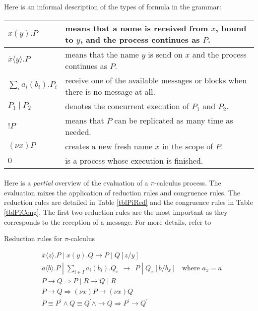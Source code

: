 \documentclass[a4paper]{report}
\numberwithin{algorithm}{chapter}
\begin{document}
\noindent
Here is an informal description of the types of formula in the grammar:\\
{\centering
\begin{tabular}{lp{9cm}}
\hline
\hline
$x(y).P$ & means that a name is received from $x$, bound to $y$, and the process continues as $P$. \\
\hline
$\overline{x} \langle y \rangle.P$ & means that the name $y$ is send on $x$ and the process continues as $P$. \\
\hline
$\sum_i a_i(b_i).P_i $ & receive one of the available messages or blocks when there is no message at all.\\
\hline
$P_1\;|\;P_2$ & denotes the concurrent execution of $P_1$ and $P_2$. \\
\hline
$!P$ & means that $P$ can be replicated as many time as needed.\\
\hline
$(\nu x)P$ & creates a new fresh name $x$ in the scope of $P$.\\%
\hline
$0$ & is a process whose execution is finished.\\
\hline
\hline
\end{tabular}
}

\paragraph{}
Here is a \emph{partial} overview of the evaluation of a $\pi$-calculus process.
The evaluation mixes the application of reduction rules and congruence rules.
The reduction rules are detailed in Table \ref{tblPiRed} and the congruence rules in Table \ref{tblPiCong}.
The first two reduction rules are the most important as they corresponds to the reception of a message.
For more details, refer to \cite{DBLP:books/sp/Milner80,DBLP:journals/iandc/MilnerPW92a,DBLP:journals/iandc/MilnerPW92b}

\begin{table}
\caption{Reduction rules for $\pi$-calculus}
\label{tblPiRed}
\centering
\begin{eqnarray*}
& \overline{x}\langle z \rangle.P \;|\; x(y).Q \rightarrow P \;|\; Q[z/y] \\
&\overline{a}\langle b \rangle.P \;|\; \sum_{i \in I} a_i(b_i).Q_i ~~ \rightarrow ~~ P \;|\; Q_x[b/b_x] ~~~~ \text{where $a_x = a$}\\
&P \rightarrow Q \Rightarrow P\;|\;R \rightarrow Q\;|\;R \\
&P \rightarrow Q \Rightarrow (\nu x)P \rightarrow (\nu x)Q \\
&P \equiv P^\prime \land Q \equiv Q^\prime \land \rightarrow Q \Rightarrow P^\prime \rightarrow Q^\prime
\end{eqnarray*}
\end{table}
\end{document}
